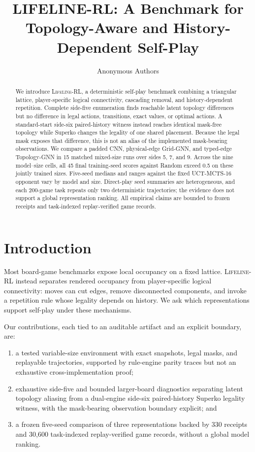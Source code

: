 \documentclass{article}
\title{LIFELINE-RL: A Benchmark for Topology-Aware and
History-Dependent Self-Play}
\author{Anonymous Authors}
\newcommand{\lifeline}{\textsc{Lifeline-RL}}
\begin{document}
\maketitle

\begin{abstract}
We introduce \lifeline, a deterministic self-play benchmark combining a
triangular lattice, player-specific logical connectivity, cascading removal,
and history-dependent repetition. Complete side-five enumeration finds
reachable latent topology differences but no difference in legal actions,
transitions, exact values, or optimal actions. A standard-start side-six
paired-history witness instead reaches identical mask-free topology while
Superko changes the legality of one shared placement. Because the legal mask
exposes that difference, this is not an alias of the implemented mask-bearing
observations. We compare
a padded CNN, physical-edge Grid-GNN, and typed-edge Topology-GNN in 15 matched
mixed-size runs over sides 5, 7, and 9. Across the nine model--size cells, all
45 final training-seed scores against Random exceed 0.5 on these jointly
trained sizes. Five-seed medians and ranges against the fixed UCT-MCTS-16
opponent vary by model and size. Direct-play seed summaries are heterogeneous,
and each 200-game task repeats only two deterministic trajectories; the
evidence does not support a global representation ranking. All empirical
claims are bounded to frozen receipts and task-indexed replay-verified game
records.
\end{abstract}

\section{Introduction}
\label{sec:introduction}

Most board-game benchmarks expose local occupancy on a fixed lattice.
\lifeline{} instead separates rendered occupancy from player-specific logical
connectivity: moves can cut edges, remove disconnected components, and invoke
a repetition rule whose legality depends on history. We ask which
representations support self-play under these mechanisms.

Our contributions, each tied to an auditable artifact and an explicit boundary,
are:
\begin{enumerate}
  \item a tested variable-size environment with exact snapshots, legal masks,
  and replayable trajectories, supported by rule-engine parity traces but not
  an exhaustive cross-implementation proof;
  \item exhaustive side-five and bounded larger-board diagnostics separating
  latent topology aliasing from a dual-engine side-six paired-history Superko
  legality witness, with the mask-bearing observation boundary explicit; and
  \item a frozen five-seed comparison of three representations backed by 330
  receipts and 30,600 task-indexed replay-verified game records, without a
  global model ranking.
\end{enumerate}
\end{document}
